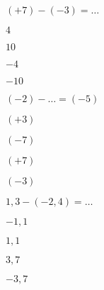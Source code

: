 \begin{QCM}
\begin{GroupeQCM}
    \begin{exercice}
      $(+ 7) - (- 3) = \ldots$
      \begin{ChoixQCM}{4}
      \item $4$
      \item $10$
      \item $- 4$
      \item $- 10$
      \end{ChoixQCM}
\begin{corrige}
   \end{corrige}
    \end{exercice}


    \begin{exercice}
      $(- 2) - \ldots = (- 5)$
      \begin{ChoixQCM}{4}
      \item $(+ 3)$
      \item $(- 7)$
      \item $(+ 7)$
      \item $(- 3)$
      \end{ChoixQCM}
\begin{corrige}
   \end{corrige}
    \end{exercice}


    \begin{exercice}
      $1,3 - (- 2,4) = \ldots$
      \begin{ChoixQCM}{4}
      \item $- 1,1$
      \item $1,1$
      \item $3,7$
      \item $- 3,7$
      \end{ChoixQCM}
\begin{corrige}
   \end{corrige}
    \end{exercice}


\end{GroupeQCM}
\end{QCM}

  